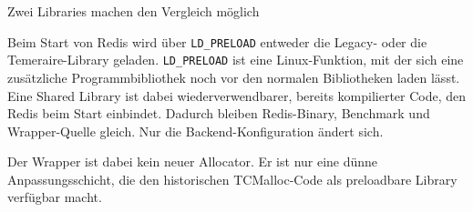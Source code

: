 \documentclass[aspectratio=169,10pt]{beamer}
\newcommand{\smallcode}[1]{\texttt{\footnotesize #1}}
\begin{document}
\begin{frame}{Zwei Libraries machen den Vergleich m\"oglich}
{  \par\medskip
  Beim Start von Redis wird über \smallcode{LD\_PRELOAD} entweder die Legacy- oder die Temeraire-Library geladen. \smallcode{LD\_PRELOAD} ist eine Linux-Funktion, mit der sich eine zusätzliche Programmbibliothek noch vor den normalen Bibliotheken laden lässt. Eine Shared Library ist dabei wiederverwendbarer, bereits kompilierter Code, den Redis beim Start einbindet. Dadurch bleiben Redis-Binary, Benchmark und Wrapper-Quelle gleich. Nur die Backend-Konfiguration ändert sich.
  
  \par\medskip
  Der Wrapper ist dabei kein neuer Allocator. Er ist nur eine dünne Anpassungsschicht, die den historischen TCMalloc-Code als preloadbare Library verfügbar macht.
}
\end{frame}
\end{document}
